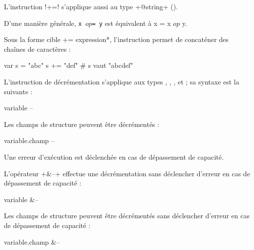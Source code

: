 L'instruction \ggs!+=! s'applique aussi au type \ggs+@string+ ().

D'une manière générale, \texttt{x $op$= y} est équivalent à {x = x $op$ y}.



Sous la forme \ggs*cible += expression*, l'instruction permet de concaténer des chaînes de caractères :
\begin{galgas}
var s = "abc"
s += "def" # s vaut "abcdef"
\end{galgas}
















L'instruction de décrémentation s'applique aux types , , ,  et  ; sa syntaxe est la suivante :

\begin{galgasbox}
variable --
\end{galgasbox}

Les champs de structure peuvent être décrémentés :
\begin{galgasbox}
variable.champ --
\end{galgasbox}

Une erreur d'exécution est déclenchée en cas de dépassement de capacité.

L'opérateur \ggs+&--+ effectue une décrémentation sans déclencher d'erreur en cas de dépassement de capacité :
\begin{galgasbox}
variable &--
\end{galgasbox}

Les champs de structure peuvent être décrémentés sans déclencher d'erreur en cas de dépassement de capacité :
\begin{galgasbox}
variable.champ &--
\end{galgasbox}





